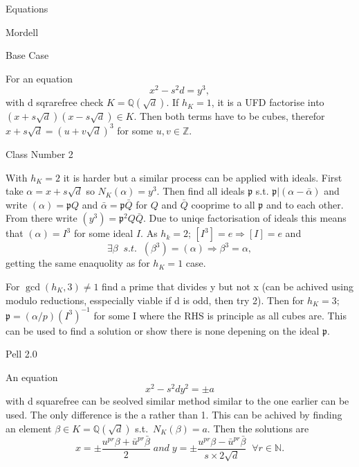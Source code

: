 \documentclass[12pt, letterpaper]{article}
\newcommand{\Q}{\mathbb{Q}}
\newcommand{\Z}{\mathbb{Z}}
\newcommand{\N}{\mathbb{N}}
\newcommand{\p}{\mathfrak{p}}
\begin{document}
\begin{section}{Equations}

  \begin{subsection}{Mordell}

    \begin{subsubsection}{Base Case}

      For an equation \[x^{2} - s^{2} d = y^{3},\] with d sqrarefree check
      \(K = \Q(\sqrt{d})\). If \(h_{K} = 1\), it is a UFD factorise into
      \((x + s \sqrt{d})(x - s \sqrt{d}) \in K\). Then both terms have to be
      cubes, therefor \(x + s \sqrt{d} = (u + v \sqrt{d})^{3}\) for some
      \(u, v \in \Z\).

    \end{subsubsection}

    \begin{subsubsection}{Class Number 2}

      With \(h_{K} = 2\) it is harder but a similar process can be applied with
      ideals. First take \(\alpha = x + s \sqrt{d}\) so
      \(N_{K}(\alpha) = y^{3}\). Then find all ideals \(\p\) s.t.
      \(\p|(\alpha - \bar{\alpha})\) and write \((\alpha) = \p Q\) and
      \(\bar{\alpha} = \p \bar{Q}\) for \(Q\) and \(\bar{Q}\) cooprime to all
      \(\p\) and to each other. \\
      From there write \((y^{3}) = \p^{2} Q \bar{Q}\). Due to uniqe
      factorisation of ideals this means that \((\alpha) = I^{3}\) for some
      ideal \(I\). As \(h_{k} = 2\); \([I^{3}] = e \Rightarrow [I] = e\)
      and \[\exists \beta \;\; s.t. \;\; (\beta^{3}) = (\alpha) \Rightarrow \beta^{3} = \alpha,\]
      getting the same enaquolity as for \(h_{K} = 1\) case.

      For \(\gcd(h_{K}, 3) \neq 1\) find a prime that divides y but not x (can
      be achived using modulo reductions, esspecially viable if d is odd, then
      try 2). Then for \(h_{K} = 3\); \(\p = (\alpha / p) (I^{3})^{-1}\) for some I where
      the RHS is principle as all cubes are. This can be used to find a solution
      or show there is none depening on the ideal \(\p\).

    \end{subsubsection}

  \end{subsection}

  \begin{subsection}{Pell 2.0}

    An equation \[x^{2} - s^{2} d y^{2} = \pm a\] with d squarefree can be
    seolved similar method similar to the one earlier can be used. The only
    difference is the a rather than 1. This can be achived by finding an element
    \(\beta \in K = \Q(\sqrt{d})\) s.t.\ \(N_{K}(\beta) = a\). Then the
    solutions are
    \[x = \pm \frac{u^{pr} \beta + \bar{u}^{pr} \bar{\beta}}{2} \; and
      \; y = \pm \frac{u^{pr} \beta - \bar{u}^{pr} \bar{\beta}}
      {s \times 2 \sqrt{d}} \;\; \forall r \in \N.\]

  \end{subsection}

\end{section}
\end{document}
